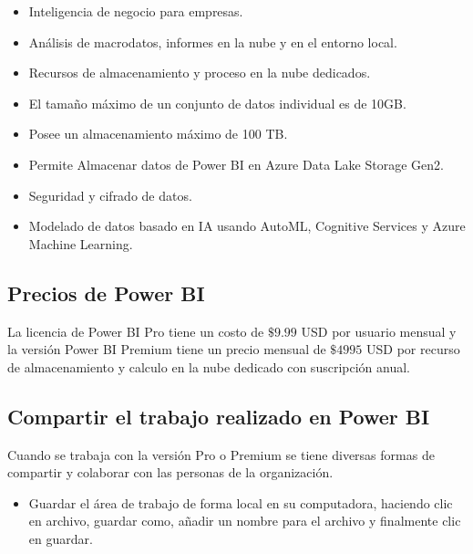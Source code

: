 \documentclass[
]{book}
\providecommand{\tightlist}{%
  \setlength{\itemsep}{0pt}\setlength{\parskip}{0pt}}
\begin{document}
\begin{itemize}
  \begin{itemize}
  \tightlist
  \item
    Inteligencia de negocio para empresas.
  \item
    Análisis de macrodatos, informes en la nube y en el entorno local.
  \item
    Recursos de almacenamiento y proceso en la nube dedicados.
  \item
    El tamaño máximo de un conjunto de datos individual es de 10GB.
  \item
    Posee un almacenamiento máximo de 100 TB.
  \item
    Permite Almacenar datos de Power BI en Azure Data Lake Storage Gen2.
  \item
    Seguridad y cifrado de datos.
  \item
    Modelado de datos basado en IA usando AutoML, Cognitive Services y Azure Machine Learning.
  \end{itemize}
\end{itemize}

\hypertarget{precios-de-power-bi}{%
\subsection{Precios de Power BI}\label{precios-de-power-bi}}

La licencia de Power BI Pro tiene un costo de \(\$9.99\) USD por usuario mensual y la versión Power BI Premium tiene un precio mensual de \(\$4995\) USD por recurso de almacenamiento y calculo en la nube dedicado con suscripción anual.

\hypertarget{compartir-el-trabajo-realizado-en-power-bi}{%
\subsection{Compartir el trabajo realizado en Power BI}\label{compartir-el-trabajo-realizado-en-power-bi}}

Cuando se trabaja con la versión Pro o Premium se tiene diversas formas de compartir y colaborar con las personas de la organización.

\begin{itemize}
\tightlist
\item
  Guardar el área de trabajo de forma local en su computadora, haciendo clic en archivo, guardar como, añadir un nombre para el archivo y finalmente clic en guardar.
\end{itemize}
\end{document}
